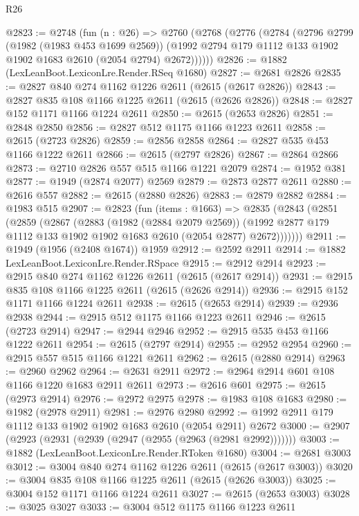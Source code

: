 \begin{lexlean}{R26}
\begin{coremodule}
@2823 := @2748
    (fun (n : @26) =>
    @2760
      (@2768
        (@2776
          (@2784
            (@2796
              @2799
              (@1982 (@1983 @453 @1699 @2569))
              (@1992 @2794 @179 @1112 @133 @1902 @1902 @1683 @2610 (@2054 @2794) @2672))))))
@2826 := @1882 (LexLeanBoot.LexiconLre.Render.RSeq @1680)
@2827 := @2681 @2826
@2835 := @2827 @840 @274 @1162 @1226 @2611 (@2615 (@2617 @2826))
@2843 := @2827 @835 @108 @1166 @1225 @2611 (@2615 (@2626 @2826))
@2848 := @2827 @152 @1171 @1166 @1224 @2611
@2850 := @2615 (@2653 @2826)
@2851 := @2848 @2850
@2856 := @2827 @512 @1175 @1166 @1223 @2611
@2858 := @2615 (@2723 @2826)
@2859 := @2856 @2858
@2864 := @2827 @535 @453 @1166 @1222 @2611
@2866 := @2615 (@2797 @2826)
@2867 := @2864 @2866
@2873 := @2710 @2826 @557 @515 @1166 @1221 @2079
@2874 := @1952 @381
@2877 := @1949 (@2874 @2077) @2569
@2879 := @2873 @2877 @2611
@2880 := @2616 @557
@2882 := @2615 (@2880 @2826)
@2883 := @2879 @2882
@2884 := @1983 @515
@2907 := @2823
    (fun (items : @1663) =>
    @2835
      (@2843
        (@2851
          (@2859
            (@2867
              (@2883
                (@1982 (@2884 @2079 @2569))
                (@1992 @2877 @179 @1112 @133 @1902 @1902 @1683 @2610 (@2054 @2877) @2672)))))))
@2911 := @1949 (@1956 (@2408 @1674)) @1959
@2912 := @2592 @2911
@2914 := @1882 LexLeanBoot.LexiconLre.Render.RSpace
@2915 := @2912 @2914
@2923 := @2915 @840 @274 @1162 @1226 @2611 (@2615 (@2617 @2914))
@2931 := @2915 @835 @108 @1166 @1225 @2611 (@2615 (@2626 @2914))
@2936 := @2915 @152 @1171 @1166 @1224 @2611
@2938 := @2615 (@2653 @2914)
@2939 := @2936 @2938
@2944 := @2915 @512 @1175 @1166 @1223 @2611
@2946 := @2615 (@2723 @2914)
@2947 := @2944 @2946
@2952 := @2915 @535 @453 @1166 @1222 @2611
@2954 := @2615 (@2797 @2914)
@2955 := @2952 @2954
@2960 := @2915 @557 @515 @1166 @1221 @2611
@2962 := @2615 (@2880 @2914)
@2963 := @2960 @2962
@2964 := @2631 @2911
@2972 := @2964 @2914 @601 @108 @1166 @1220 @1683 @2911 @2611
@2973 := @2616 @601
@2975 := @2615 (@2973 @2914)
@2976 := @2972 @2975
@2978 := @1983 @108 @1683
@2980 := @1982 (@2978 @2911)
@2981 := @2976 @2980
@2992 := @1992 @2911 @179 @1112 @133 @1902 @1902 @1683 @2610 (@2054 @2911) @2672
@3000 := @2907 (@2923 (@2931 (@2939 (@2947 (@2955 (@2963 (@2981 @2992)))))))
@3003 := @1882 (LexLeanBoot.LexiconLre.Render.RToken @1680)
@3004 := @2681 @3003
@3012 := @3004 @840 @274 @1162 @1226 @2611 (@2615 (@2617 @3003))
@3020 := @3004 @835 @108 @1166 @1225 @2611 (@2615 (@2626 @3003))
@3025 := @3004 @152 @1171 @1166 @1224 @2611
@3027 := @2615 (@2653 @3003)
@3028 := @3025 @3027
@3033 := @3004 @512 @1175 @1166 @1223 @2611

\end{coremodule}
\end{lexlean}
